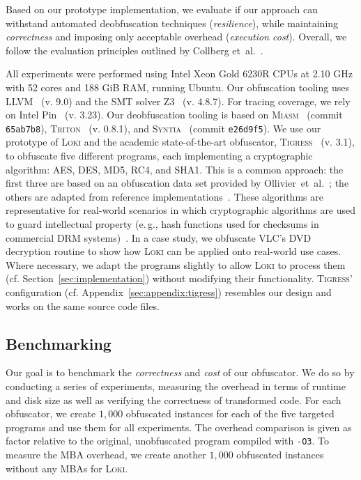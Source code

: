 \documentclass[letterpaper,twocolumn,10pt]{article}
\newcommand{\etal}{et~al.\xspace}
\newcommand{\eg}{e.\,g.,\xspace}
\newcommand{\cf}{cf.\xspace}
\theoremstyle{customexample}
\theoremstyle{customexperiment}
\newcommand{\loki}{\textsc{Loki}\xspace}
\newcommand{\syntia}{\textsc{Syntia}\xspace}
\newcommand{\tigress}{\textsc{Tigress}\xspace}
\newcommand{\miasm}{\textsc{Miasm}\xspace}
\newcommand{\triton}{\textsc{Triton}\xspace}
\newcommand{\zt}{\textsc{Z3}\xspace}
\newcommand{\vlc}{\textsc{VLC}\xspace}
\begin{document}
Based on our prototype implementation, we evaluate if our approach can withstand automated deobfuscation techniques (\emph{resilience}), while maintaining \emph{correctness} and imposing only acceptable overhead (\emph{execution cost}). Overall, we follow the evaluation principles outlined by Collberg \etal~\cite{collberg1998manufacturing}.

All experiments were performed using Intel Xeon Gold 6230R CPUs at 2.10 GHz with 52 cores and 188 GiB RAM, running Ubuntu. Our obfuscation tooling uses LLVM~\cite{llvm_homepage} (v. 9.0) and the SMT solver \zt~\cite{z3-homepage} (v. 4.8.7). For tracing coverage, we rely on Intel Pin~\cite{intelpin} (v. 3.23). Our deobfuscation tooling is based on \miasm~\cite{miasm-github} (commit \texttt{65ab7b8}), \triton~\cite{salwan2015triton} (v. 0.8.1), and \syntia~\cite{blazytko2017syntia} (commit \texttt{e26d9f5}).
We use our prototype of \loki and the academic state-of-the-art obfuscator, \tigress~\cite{tigress} (v. 3.1), to obfuscate five different programs, each implementing a cryptographic algorithm: AES, DES, MD5, RC4, and SHA1. 
This is a common approach: the first three are based on an obfuscation data set provided by Ollivier~\etal~\cite{ollivier2019howto}; the others are adapted from reference implementations~\cite{rc4implementation,sha1implementation}. 
These algorithms are representative for real-world scenarios in which cryptographic algorithms are used to guard intellectual property (\eg hash functions used for checksums in commercial DRM systems)~\cite{nakanishi2020intertwining}. 
In a case study, we obfuscate \vlc's DVD decryption routine to show how \loki can be applied onto real-world use cases.
Where necessary, we adapt the programs slightly to allow \loki to process them (\cf Section~\ref{sec:implementation}) without modifying their functionality. 
\tigress' configuration (\cf Appendix~\ref{sec:appendix:tigress}) resembles our design and works on the same source code files.


\subsection{Benchmarking}\label{sec:benchmarking}

Our goal is to benchmark the \emph{correctness} and \emph{cost} of our obfuscator. We do so by conducting a series of experiments, measuring the overhead in terms of runtime and disk size as well as verifying the correctness of transformed code. 
For each obfuscator, we create $1,000$ obfuscated instances for each of the five targeted programs and use them for all experiments. The overhead comparison is given as factor relative to the original, unobfuscated program compiled with \texttt{-O3}. To measure the MBA overhead, we create another $1,000$ obfuscated instances without any MBAs for \loki.
\end{document}

